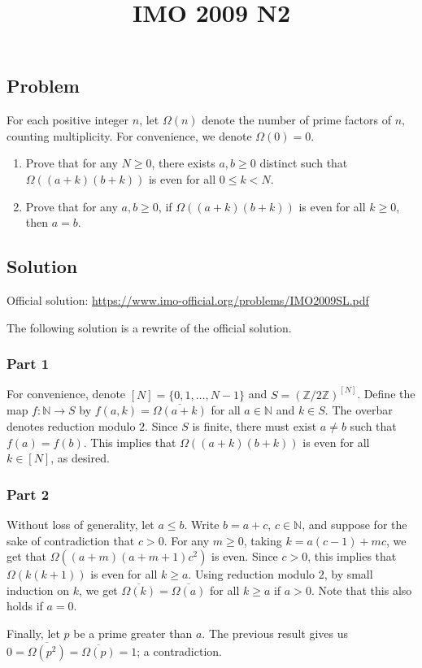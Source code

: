 \documentclass{article}
\title{IMO 2009 N2}
\author{}
\date{}
\newcommand{\N}{\mathbb{N}}
\newcommand{\Z}{\mathbb{Z}}
\begin{document}
\maketitle



\subsection*{Problem}

For each positive integer $n$, let $\Omega(n)$ denote the number of prime factors of $n$, counting multiplicity.
For convenience, we denote $\Omega(0) = 0$.
\begin{enumerate}
    \item Prove that for any $N \geq 0$, there exists $a, b \geq 0$ distinct such that $\Omega((a + k)(b + k))$ is even for all $0 \leq k < N$.
    \item Prove that for any $a, b \geq 0$, if $\Omega((a + k)(b + k))$ is even for all $k \geq 0$, then $a = b$.
\end{enumerate}



\subsection*{Solution}

Official solution: \url{https://www.imo-official.org/problems/IMO2009SL.pdf}

The following solution is a rewrite of the official solution.


\subsubsection*{Part 1}

For convenience, denote $[N] = \{0, 1, \ldots, N - 1\}$ and $S = (\Z/2\Z)^[N]$.
Define the map $f : \N \to S$ by $f(a, k) = \overline{\Omega(a + k)}$ for all $a \in \N$ and $k \in S$.
The overbar denotes reduction modulo $2$.
Since $S$ is finite, there must exist $a \neq b$ such that $f(a) = f(b)$.
This implies that $\Omega((a + k)(b + k))$ is even for all $k \in [N]$, as desired.


\subsubsection*{Part 2}

Without loss of generality, let $a \leq b$.
Write $b = a + c$, $c \in \N$, and suppose for the sake of contradiction that $c > 0$.
For any $m \geq 0$, taking $k = a(c - 1) + mc$, we get that $\Omega((a + m)(a + m + 1) c^2)$ is even.
Since $c > 0$, this implies that $\Omega(k(k + 1))$ is even for all $k \geq a$.
Using reduction modulo $2$, by small induction on $k$, we get $\overline{\Omega(k)} = \overline{\Omega(a)}$ for all $k \geq a$ if $a > 0$.
Note that this also holds if $a = 0$.

Finally, let $p$ be a prime greater than $a$.
The previous result gives us $0 = \overline{\Omega(p^2)} = \overline{\Omega(p)} = 1$; a contradiction.
\end{document}
